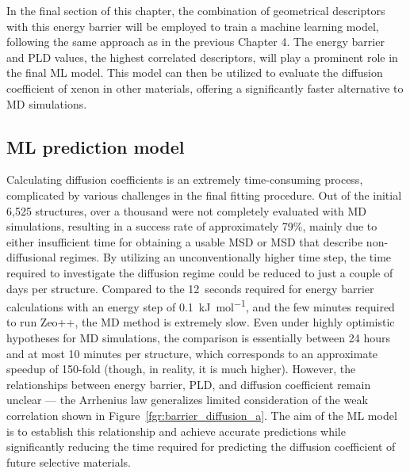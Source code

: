 \documentclass[main]{subfiles}
\begin{document}
In the final section of this chapter, the combination of geometrical descriptors with this energy barrier will be employed to train a machine learning model, following the same approach as in the previous Chapter 4. The energy barrier and PLD values, the highest correlated descriptors, will play a prominent role in the final ML model. This model can then be utilized to evaluate the diffusion coefficient of xenon in other materials, offering a significantly faster alternative to MD simulations.

\subsection{ML prediction model}

Calculating diffusion coefficients is an extremely time-consuming process, complicated by various challenges in the final fitting procedure. Out of the initial 6,525 structures, over a thousand were not completely evaluated with MD simulations, resulting in a success rate of approximately 79\%, mainly due to either insufficient time for obtaining a usable MSD or MSD that describe non-diffusional regimes. By utilizing an unconventionally higher time step, the time required to investigate the diffusion regime could be reduced to just a couple of days per structure. Compared to the \SI{12}{seconds} required for energy barrier calculations with an energy step of \SI{0.1}{\kJ\per\mol}, and the few minutes required to run Zeo++, the MD method is extremely slow. Even under highly optimistic hypotheses for MD simulations, the comparison is essentially between 24 hours and at most 10 minutes per structure, which corresponds to an approximate speedup of 150-fold (though, in reality, it is much higher). However, the relationships between energy barrier, PLD, and diffusion coefficient remain unclear --- the Arrhenius law generalizes limited consideration of the weak correlation shown in Figure~\ref{fgr:barrier_diffusion_a}. The aim of the ML model is to establish this relationship and achieve accurate predictions while significantly reducing the time required for predicting the diffusion coefficient of future selective materials.
\end{document}
